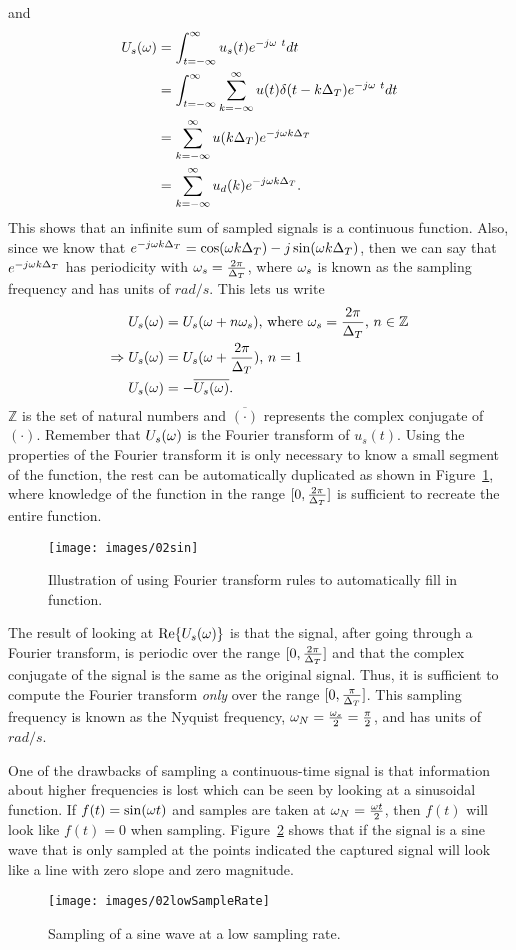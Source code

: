 and
\begin{align*}
U_s(\omega) &= \int_{t=-\infty}^\infty u_s(t)e^{-j\omega\ t} dt \\
&= \int_{t=-\infty}^\infty \sum_{k=-\infty}^\infty u(t)\delta(t-k\Delta_T)e^{-j\omega\ t} dt \\
&= \sum_{k=-\infty}^\infty u(k\Delta_T) e^{-j\omega k\Delta_T} \\
&= \sum_{k=-\infty}^\infty u_d(k) e^{-j\omega k\Delta_T}.
\end{align*}
This shows that an infinite sum of sampled signals is a continuous function.
Also, since we know that $e^{-j\omega k\Delta_T} = \cos(\omega k\Delta_T) - j\sin(\omega k\Delta_T)$, then we can say that $e^{-j\omega k\Delta_T}$ has periodicity with $\omega_s = \frac{2\pi}{\Delta_T}$, where $\omega_s$ is known as the sampling frequency and has units of $rad/s$.
This lets us write
\begin{align*}
U_s(\omega) &= U_s(\omega+n\omega_s) \text{, where } \omega_s = \frac{2\pi}{\Delta_T} \text{, } n\in\mathbb{Z} \\
\Rightarrow U_s(\omega) &= U_s(\omega+\frac{2\pi}{\Delta_T}) \text{, } n=1 \\
U_s(\omega) &= -\overline{U_s(\omega)}.
\end{align*}
$\mathbb{Z}$ is the set of natural numbers and $\overline{(\cdot)}$ represents the complex conjugate of $(\cdot)$.
Remember that $U_s(\omega)$ is the Fourier transform of $u_s(t)$.
Using the properties of the Fourier transform it is only necessary to know a small segment of the function, the rest can be automatically duplicated as shown in Figure~\ref{fig:02sin}, where knowledge of the function in the range $[0,\frac{2\pi}{\Delta_T}]$ is sufficient to recreate the entire function.
\begin{figure}[ht!]
\centering
\texttt{[image: images/02sin]}
\caption{Illustration of using Fourier transform rules to automatically fill in function.}%
\label{fig:02sin}
\end{figure}

The result of looking at $\text{Re}\{U_s(\omega)\}$ is that the signal, after going through a Fourier transform, is periodic over the range $[0, \frac{2\pi}{\Delta_T}]$ and that the complex conjugate of the signal is the same as the original signal.
Thus, it is sufficient to compute the Fourier transform \textit{only} over the range $[0, \frac{\pi}{\Delta_T}]$.
This sampling frequency is known as the Nyquist frequency, $\omega_N = \frac{\omega_s}{2} = \frac{\pi}{2}$, and has units of $rad/s$.

One of the drawbacks of sampling a continuous-time signal is that information about higher frequencies is lost which can be seen by looking at a sinusoidal function.
If $f(t) = \sin(\omega t)$ and samples are taken at $\omega_N = \frac{\omega t}{2}$, then $f(t)$ will look like $f(t) = 0$ when sampling.
Figure~\ref{fig:02lowSampleRate} shows that if the signal is a sine wave that is only sampled at the points indicated the captured signal will look like a line with zero slope and zero magnitude.
\begin{figure}[ht!]
\centering
\texttt{[image: images/02lowSampleRate]}
\caption{Sampling of a sine wave at a low sampling rate.}%
\label{fig:02lowSampleRate}
\end{figure}

